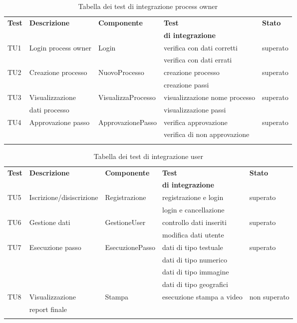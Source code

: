 \begin{longtable}{lllll}
\toprule
\textbf{Test} & \textbf{Descrizione} & \textbf{Componente} & \textbf{Test} & \textbf{Stato}\\
&&&\textbf{di integrazione}&\\
\toprule
TU1& Login process owner &Login & verifica con dati corretti&superato\\
&&&verifica con dati errati&\\
\midrule
TU2& Creazione processo&NuovoProcesso&creazione processo&superato\\
&&&creazione passi&\\
\midrule
TU3& Visualizzazione&VisualizzaProcesso&visualizzazione nome processo&superato\\
&dati processo&&visualizzazione passi&\\
\midrule
TU4& Approvazione passo&ApprovazionePasso&verifica approvazione&superato\\
&&&verifica di non approvazione&\\
\bottomrule
\caption{Tabella dei test di integrazione process owner}
\end{longtable}

\begin{longtable}{lllll}
\toprule
\textbf{Test} & \textbf{Descrizione} & \textbf{Componente} & \textbf{Test} & \textbf{Stato}\\
&&&\textbf{di integrazione}&\\
\toprule
TU5& Iscrizione/disiscrizione&Registrazione&registrazione e login&superato\\
&&&login e cancellazione&\\
\midrule
TU6& Gestione dati&GestioneUser&controllo dati inseriti&superato\\
&&&modifica dati utente&\\
\midrule
TU7& Esecuzione passo&EsecuzionePasso&dati di tipo testuale&superato\\
&&&dati di tipo numerico&\\
&&&dati di tipo immagine&\\
&&&dati di tipo geografici&\\
\midrule
TU8& Visualizzazione &Stampa&esecuzione stampa a video& non superato\\
&report finale&&&\\
\bottomrule
\caption{Tabella dei test di integrazione user}
\end{longtable}